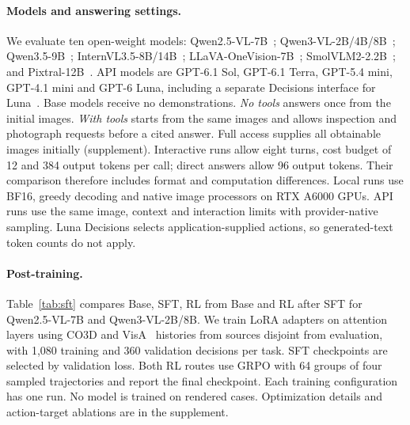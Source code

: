 \documentclass[10pt,twocolumn,letterpaper]{article}
\begin{document}
\paragraph{Models and answering settings.}
We evaluate ten open-weight models: Qwen2.5-VL-7B~\cite{qwen25}; Qwen3-VL-2B/4B/8B~\cite{qwen3}; Qwen3.5-9B~\cite{qwen35}; InternVL3.5-8B/14B~\cite{internvl35}; LLaVA-OneVision-7B~\cite{llavaonevision}; SmolVLM2-2.2B~\cite{smolvlm2}; and Pixtral-12B~\cite{pixtral}.
API models are GPT-6.1 Sol, GPT-6.1 Terra, GPT-5.4 mini, GPT-4.1 mini and GPT-6 Luna, including a separate Decisions interface for Luna~\cite{openai_api,openai_decisions}.
Base models receive no demonstrations.
\emph{No tools} answers once from the initial images.
\emph{With tools} starts from the same images and allows inspection and photograph requests before a cited answer.
Full access supplies all obtainable images initially (supplement).
Interactive runs allow eight turns, cost budget of 12 and 384 output tokens per call; direct answers allow 96 output tokens.
Their comparison therefore includes format and computation differences.
Local runs use BF16, greedy decoding and native image processors on RTX A6000 GPUs.
API runs use the same image, context and interaction limits with provider-native sampling.
Luna Decisions selects application-supplied actions, so generated-text token counts do not apply.

\paragraph{Post-training.}
Table~\ref{tab:sft} compares Base, SFT, RL from Base and RL after SFT for Qwen2.5-VL-7B and Qwen3-VL-2B/8B.
We train LoRA adapters on attention layers using CO3D and VisA~\cite{visa} histories from sources disjoint from evaluation, with 1,080 training and 360 validation decisions per task.
SFT checkpoints are selected by validation loss.
Both RL routes use GRPO with 64 groups of four sampled trajectories and report the final checkpoint.
Each training configuration has one run.
No model is trained on rendered cases.
Optimization details and action-target ablations are in the supplement.


\end{document}
